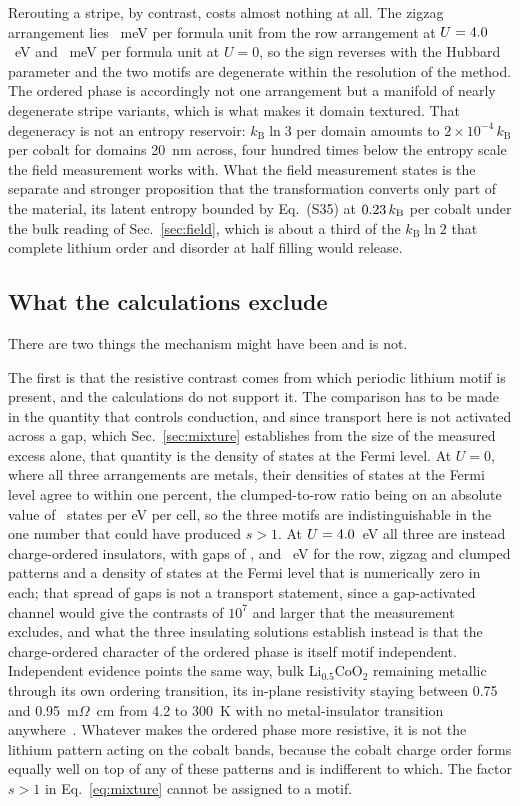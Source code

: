 \documentclass[reprint,twocolumn,prb,amsmath,amssymb,superscriptaddress,floatfix]{revtex4-2}
\newcommand{\kB}{k_{\mathrm{B}}}
\begin{document}
Rerouting a stripe, by contrast, costs almost nothing at all. The zigzag arrangement lies \deltaEZigzag~meV per
formula unit from the row arrangement at $U=4.0$~eV and \deltaEZigzagUzero~meV per formula
unit at $U=0$, so the sign reverses with the Hubbard parameter and the two motifs are degenerate
within the resolution of the method. The ordered phase is accordingly not one arrangement but a
manifold of nearly degenerate stripe variants, which is what makes it domain textured. That
degeneracy is not an entropy reservoir: $\kB\ln3$ per domain amounts to $2\times10^{-4}\,\kB$
per cobalt for domains 20~nm across, four hundred times below the entropy scale the field
measurement works with. What the field measurement
states is the separate and stronger proposition that the transformation converts only part of
the material, its latent entropy bounded by Eq.~(S35) at $\dSbound\,\kB$ per cobalt under the
bulk reading of Sec.~\ref{sec:field}, which is about a third of the $\kB\ln2$ that complete
lithium order and disorder at half filling would release.

\subsection{What the calculations exclude}

There are two things the mechanism might have been and is not.

The first is that the resistive contrast comes from which periodic lithium motif is present, and
the calculations do not support it. The comparison has to be made in the quantity that controls
conduction, and since transport here is not activated across a gap, which Sec.~\ref{sec:mixture}
establishes from the size of the measured excess alone, that quantity is the density of states
at the Fermi level. At $U=0$, where all three arrangements are metals, their densities of states
at the Fermi level agree to within one percent, the clumped-to-row ratio being \dosContrast{} on
an absolute value of \dosRowUzero~states per eV per cell, so the three motifs are
indistinguishable in the one number that could have produced $s>1$. At $U=4.0$~eV all three
are instead charge-ordered insulators, with gaps of \gapRowMotif, \gapZigzag{} and
\gapClumped~eV for the row, zigzag and clumped patterns and a density of states at the Fermi
level that is numerically zero in each; that spread of gaps is not a transport statement, since
a gap-activated channel would give the contrasts of $10^{7}$ and larger that the measurement
excludes, and what the three insulating solutions establish instead is that the charge-ordered
character of the ordered phase is itself motif independent. Independent evidence points the same
way, bulk Li$_{0.5}$CoO$_2$ remaining metallic through its own ordering transition, its in-plane
resistivity staying between 0.75 and 0.95~m$\Omega$~cm from 4.2 to 300~K with no metal-insulator
transition anywhere~\cite{OuYang2012}. Whatever makes the ordered phase more resistive, it is not
the lithium pattern acting on the cobalt bands, because the cobalt charge order forms equally
well on top of any of these patterns and is indifferent to which. The factor $s>1$ in
Eq.~\eqref{eq:mixture} cannot be assigned to a motif.
\end{document}

